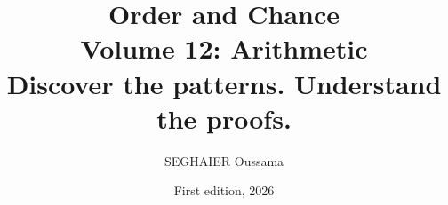 \documentclass[11pt,openany]{book}
\title{\Huge\textbf{Order and Chance}\\[0.4em]\LARGE Volume 12: Arithmetic\\[0.6em]
\Large Discover the patterns. Understand the proofs.}
\author{SEGHAIER Oussama}
\date{First edition, 2026}
\begin{document}
\frontmatter
\makecover
\maketitle

\tableofcontents

\mainmatter















\end{document}
